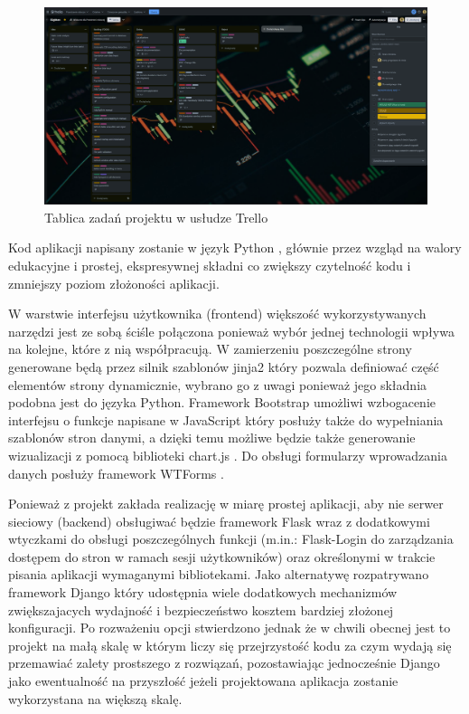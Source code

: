 \documentclass[a4paper,10pt, twoside]{report}
\begin{document}
\begin{large}
\begin{figure}[H]           %
    \centering
    \includegraphics[width=12cm]{figures/trello_kanban.png}
    \caption{Tablica zadań projektu w usłudze Trello}
    \label{fig:trello}
\end{figure}

{Kod aplikacji napisany zostanie w język Python \cite{Python}, głównie przez 
wzgląd na walory edukacyjne i prostej, ekspresywnej składni co zwiększy 
czytelność kodu i zmniejszy poziom złożoności aplikacji.}

{W warstwie interfejsu użytkownika (frontend) większość wykorzystywanych 
narzędzi jest ze sobą ściśle połączona ponieważ wybór jednej technologii 
wpływa na kolejne, które z nią współpracują. W zamierzeniu poszczególne strony 
generowane będą przez silnik szablonów jinja2 \cite{jinja} który pozwala 
definiować część elementów strony dynamicznie, wybrano go z uwagi ponieważ jego 
składnia podobna jest do języka Python. Framework Bootstrap \cite{Bootstrap} 
umożliwi wzbogacenie interfejsu o funkcje napisane w JavaScript 
\cite{JavaScript} który posłuży także do wypełniania szablonów stron danymi, a 
dzięki temu możliwe będzie także generowanie wizualizacji z pomocą biblioteki 
chart.js \cite{chart.js}. Do obsługi formularzy wprowadzania danych posłuży 
framework WTForms \cite{WTForms}.}

{Ponieważ z projekt zakłada realizację w miarę prostej aplikacji, aby nie 
serwer sieciowy (backend) obsługiwać będzie framework Flask \cite{Flask} wraz z 
dodatkowymi wtyczkami do obsługi poszczególnych funkcji (m.in.: Flask-Login 
\cite{Flask-Login} do zarządzania dostępem do stron w ramach sesji użytkowników) 
oraz określonymi w trakcie pisania aplikacji wymaganymi bibliotekami. 
Jako alternatywę rozpatrywano framework Django \cite{Django} który udostępnia 
wiele dodatkowych mechanizmów zwiększajacych wydajność i bezpieczeństwo kosztem 
bardziej złożonej konfiguracji. Po rozważeniu opcji stwierdzono jednak że w 
chwili obecnej jest to projekt na małą skalę w którym liczy się przejrzystość 
kodu za czym wydają się przemawiać zalety prostszego z rozwiązań, pozostawiając 
jednocześnie Django jako ewentualność na przyszłość jeżeli projektowana 
aplikacja zostanie wykorzystana na większą skalę.}


\end{large}
\end{document}
